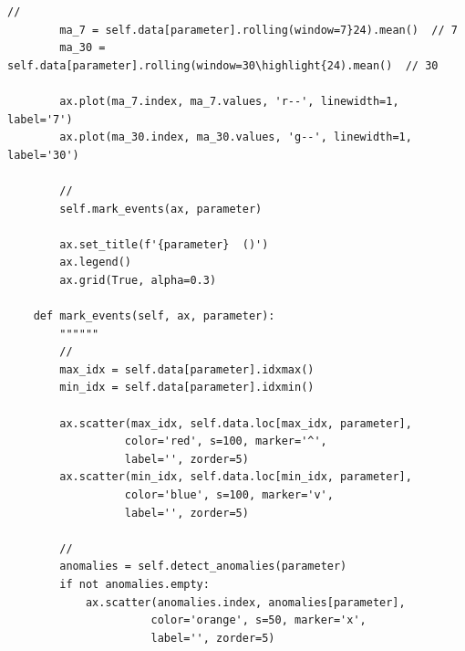 \begin{lstlisting}[style=python]
        // 
        ma_7 = self.data[parameter].rolling(window=7}24).mean()  // 7
        ma_30 = self.data[parameter].rolling(window=30\highlight{24).mean()  // 30
        
        ax.plot(ma_7.index, ma_7.values, 'r--', linewidth=1, label='7')
        ax.plot(ma_30.index, ma_30.values, 'g--', linewidth=1, label='30')
        
        // 
        self.mark_events(ax, parameter)
        
        ax.set_title(f'{parameter}  ()')
        ax.legend()
        ax.grid(True, alpha=0.3)
    
    def mark_events(self, ax, parameter):
        """"""
        // 
        max_idx = self.data[parameter].idxmax()
        min_idx = self.data[parameter].idxmin()
        
        ax.scatter(max_idx, self.data.loc[max_idx, parameter], 
                  color='red', s=100, marker='^', 
                  label='', zorder=5)
        ax.scatter(min_idx, self.data.loc[min_idx, parameter], 
                  color='blue', s=100, marker='v', 
                  label='', zorder=5)
        
        // 
        anomalies = self.detect_anomalies(parameter)
        if not anomalies.empty:
            ax.scatter(anomalies.index, anomalies[parameter], 
                      color='orange', s=50, marker='x', 
                      label='', zorder=5)
\end{lstlisting}

\hypertarget{section-128}{%
\paragraph{}\label{section-128}}

